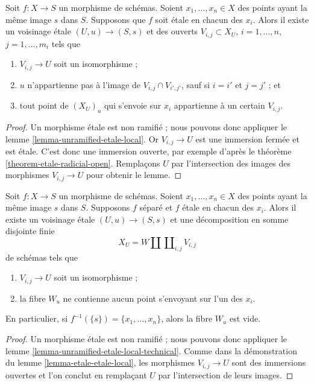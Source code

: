 \begin{lemma}
\label{lemma-etale-etale-local}
Soit $f : X \to S$ un morphisme de schémas.
Soient $x_1, \ldots, x_n \in X$ des points ayant la même image $s$ dans $S$.
Supposons que $f$ soit \'etale en chacun des $x_i$.
Alors il existe un voisinage \'etale $(U, u) \to (S, s)$
et des ouverts $V_{i, j} \subset X_U$, $i = 1, \ldots, n$, $j = 1, \ldots, m_i$
tels que
\begin{enumerate}
\item $V_{i, j} \to U$ soit un isomorphisme ;
\item $u$ n'appartienne pas à l'image de $V_{i, j} \cap V_{i', j'}$, sauf si
$i = i'$ et $j = j'$ ; et
\item tout point de $(X_U)_u$ qui s'envoie sur $x_i$ appartienne à un certain $V_{i, j}$.
\end{enumerate}
\end{lemma}

\begin{proof}
Un morphisme \'etale est non ramifié ; nous pouvons donc appliquer le
lemme \ref{lemma-unramified-etale-local}.
Or $V_{i, j} \to U$ est une immersion fermée et est \'etale.
C'est donc une immersion ouverte, par exemple d'après le
théorème \ref{theorem-etale-radicial-open}.
Remplaçons $U$ par l'intersection des images des morphismes $V_{i, j} \to U$
pour obtenir le lemme.
\end{proof}

\begin{lemma}
\label{lemma-etale-etale-local-technical}
Soit $f : X \to S$ un morphisme de schémas.
Soient $x_1, \ldots, x_n \in X$ des points ayant la même image $s$ dans $S$.
Supposons $f$ séparé et $f$ \'etale en chacun des $x_i$.
Alors il existe un voisinage \'etale $(U, u) \to (S, s)$
et une décomposition en somme disjointe finie
$$
X_U =
W \amalg \coprod\nolimits_{i, j} V_{i, j}
$$
de schémas tels que
\begin{enumerate}
\item $V_{i, j} \to U$ soit un isomorphisme ;
\item la fibre $W_u$ ne contienne aucun point s'envoyant sur l'un des $x_i$.
\end{enumerate}
En particulier, si $f^{-1}(\{s\}) = \{x_1, \ldots, x_n\}$, alors
la fibre $W_u$ est vide.
\end{lemma}

\begin{proof}
Un morphisme \'etale est non ramifié ; nous pouvons donc appliquer le
lemme \ref{lemma-unramified-etale-local-technical}.
Comme dans la démonstration du
lemme \ref{lemma-etale-etale-local},
les morphismes $V_{i, j} \to U$ sont des immersions ouvertes et
l'on conclut en remplaçant $U$ par l'intersection de leurs
images.
\end{proof}

